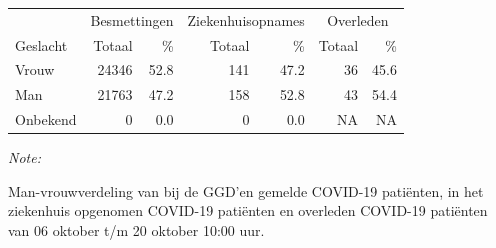 \documentclass[
  english,
  man,floatsintext]{apa6}
\begin{document}
\begin{table}
\centering\begingroup\fontsize{11}{13}\selectfont

\begin{threeparttable}
\begin{tabular}{lrrrrrr}
\toprule
\multicolumn{1}{c}{ } & \multicolumn{2}{c}{Besmettingen} & \multicolumn{2}{c}{Ziekenhuisopnames} & \multicolumn{2}{c}{Overleden} \\
\cmidrule(l{3pt}r{3pt}){2-3} \cmidrule(l{3pt}r{3pt}){4-5} \cmidrule(l{3pt}r{3pt}){6-7}
Geslacht & Totaal & \% & Totaal & \% & Totaal & \%\\
\midrule
Vrouw & 24346 & 52.8 & 141 & 47.2 & 36 & 45.6\\
Man & 21763 & 47.2 & 158 & 52.8 & 43 & 54.4\\
Onbekend & 0 & 0.0 & 0 & 0.0 & NA & NA\\
\bottomrule
\end{tabular}
\begin{tablenotes}
\item \textit{Note: } 
\item Man-vrouwverdeling van bij de GGD’en gemelde COVID-19 patiënten, in het ziekenhuis opgenomen COVID-19 patiënten en overleden COVID-19 patiënten van 06 oktober t/m 20 oktober 10:00 uur.
\end{tablenotes}
\end{threeparttable}
\endgroup{}
\end{table}
\newpage
\end{document}
